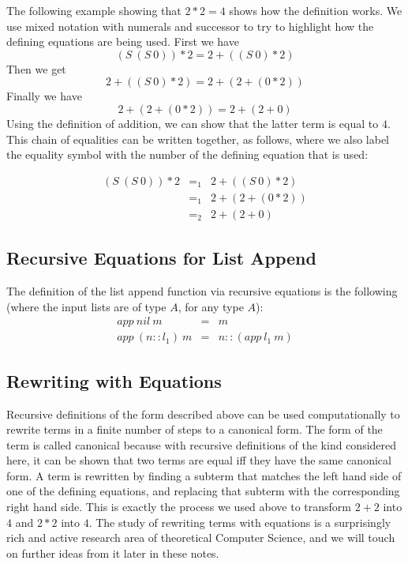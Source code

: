 \documentclass{book}[12pt]
\begin{document}
\noindent The following example showing that $2*2 = 4$ shows how the
definition works.  We use mixed notation with numerals and successor
to try to highlight how the defining equations are being used.  First
we have
\[
(S\ (S\ 0)) * 2 =
2 + ((S\ 0) * 2) 
\]
Then we get
\[
2 + ((S\ 0) * 2) = 2 + (2 + (0 * 2))
\]
Finally we have
\[
2 + (2 + (0 * 2)) = 2 + (2 + 0)
\]
Using the definition of addition, we can show that the latter term is
equal to $4$.  This chain of equalities can be written together, as
follows, where we also label the equality symbol with the number of
the defining equation that is used:

\[ \begin{array}{lll}
(S\ (S\ 0)) * 2 & =_1 & 2 + ((S\ 0) * 2) \\
\ & =_1 & 2 + (2 + (0 * 2)) \\
\ & =_2 & 2 + (2 + 0)
\end{array}
\]

\subsection{Recursive Equations for List Append}

The definition of the list append function via recursive equations is
the following (where the input lists are of type $A$, for any type
$A$):
\begin{eqnarray*}
\textit{app}\ \textit{nil}\ m &=& m \\
\textit{app}\ (n :: l_1)\ m &=& n :: (\textit{app}\ l_1\ m)
\end{eqnarray*}

\subsection{Rewriting with Equations}

Recursive definitions of the form described above can be used
computationally to rewrite terms in a finite number of steps to a
canonical form.  The form of the term is called canonical because with
recursive definitions of the kind considered here, it can be shown
that two terms are equal iff they have the same canonical form.  A
term is rewritten by finding a subterm that matches the left hand side
of one of the defining equations, and replacing that subterm with the
corresponding right hand side.  This is exactly the process we used
above to transform $2+2$ into $4$ and $2*2$ into $4$.  The study of
rewriting terms with equations is a surprisingly rich and active
research area of theoretical Computer Science, and we will touch on
further ideas from it later in these notes.
\end{document}
